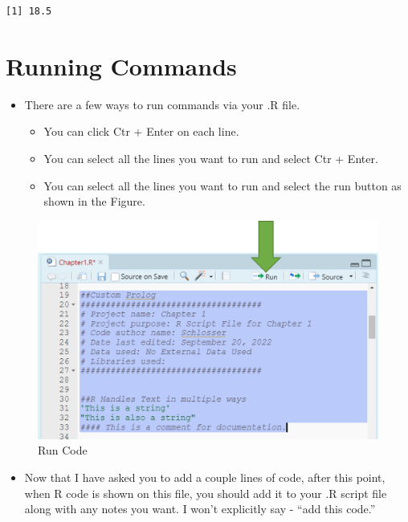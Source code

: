 \documentclass[
  letterpaper,
  DIV=11,
  numbers=noendperiod]{scrreprt}
\providecommand{\tightlist}{%
  \setlength{\itemsep}{0pt}\setlength{\parskip}{0pt}}\usepackage{longtable,booktabs,array}
\begin{document}
\begin{verbatim}
[1] 18.5
\end{verbatim}

\section{Running Commands}\label{running-commands}

\begin{itemize}
\tightlist
\item
  There are a few ways to run commands via your .R file.

  \begin{itemize}
  \tightlist
  \item
    You can click Ctr + Enter on each line.
  \item
    You can select all the lines you want to run and select Ctr + Enter.
  \item
    You can select all the lines you want to run and select the run
    button as shown in the Figure.
  \end{itemize}
\end{itemize}

\begin{figure}[H]

{\centering \includegraphics{Pictures/Ch1/Run.png}

}

\caption{Run Code}

\end{figure}%

\begin{itemize}
\tightlist
\item
  Now that I have asked you to add a couple lines of code, after this
  point, when R code is shown on this file, you should add it to your .R
  script file along with any notes you want. I won't explicitly say -
  ``add this code.''
\end{itemize}
\end{document}
